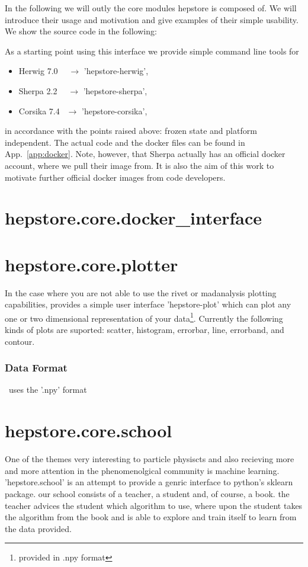 


In the following we will outly the core modules hepstore is composed
of. We will introduce their usage and motivation and give examples of
their simple usability.
 We show
the source code in the following:
%
\begin{changemargin}{1.5cm}{1.5cm} 
  
\end{changemargin}
%
As a starting point using this interface we provide simple command
line tools for
%
\begin{itemize}
\item Herwig 7.0 ~$~~\rightarrow$ 'hepstore-herwig',
\item Sherpa 2.2 ~$~~\rightarrow$ 'hepstore-sherpa',
\item Corsika 7.4 $~~\rightarrow$ 'hepstore-corsika',
\end{itemize}
%
in accordance with the points raised above: frozen state and platform
independent. The actual code and the docker files can be found in
App.~\ref{app:docker}. Note, however, that Sherpa actually has an
official docker account, where we pull their image from. It is also
the aim of this work to motivate further official docker images from
code developers.


\section{hepstore.core.docker\_interface}

\section{hepstore.core.plotter}

In the case where you are not able to use the rivet or madanalysis
plotting capabilities, \hepstore provides a simple user interface
'hepstore-plot' which can plot any one or two dimensional
representation of your data\footnote{provided in .npy
  format}. Currently the following kinds of plots are suported:
scatter, histogram, errorbar, line, errorband, and contour.

\subsubsection{Data Format}

\hepstore~uses the '.npy' format

\section{hepstore.core.school}
One of the themes very interesting to particle physiscts and also
recieving more and more attention in the phenomenolgical community is
machine learning. 'hepstore.school' is an attempt to provide a genric
interface to python's sklearn package. our school consists of a
teacher, a student and, of course, a book. the teacher advices the
student which algorithm to use, where upon the student takes the
algorithm from the book and is able to explore and train itself to
learn from the data provided.

